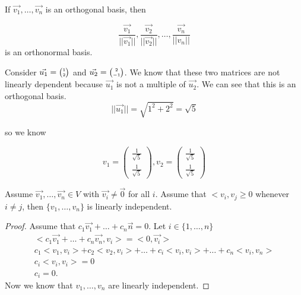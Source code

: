   If $\vec{v_1},\ldots,\vec{v_n}$ is an orthogonal basis, then 

  \begin{equation}
    \frac{\vec{v_1}}{| |\vec{v_1}| |},\frac{\vec{v_2}}{| | \vec{v_2} | |},\ldots,\frac{\vec{v_n}}{| | v_n | |}
  \end{equation}
  is an orthonormal basis.

  \begin{problem}
    Consider $\vec{u_1}=\SmallMatrix{1\\2}$ and $\vec{u_2}=\SmallMatrix{2\\-1}$. We know that these two matrices are not linearly dependent because $\vec{u_1}$ is not a multiple of $\vec{u_2}$. We can see that this is an orthogonal basis.
    \begin{equation}
      | | \vec{u_1} | | = \sqrt{1^2+2^2} =\sqrt{5} 
    \end{equation}

    so we know

    \begin{equation}
      v_1=\begin{pmatrix} \frac{1}{\sqrt{5} }\\\frac{1}{\sqrt{5} } \end{pmatrix} ,v_2=\begin{pmatrix} \frac{1}{\sqrt{5} }\\\frac{1}{\sqrt{5} } \end{pmatrix} 
    \end{equation}
  \end{problem}

  \begin{prop}
    Assume $\vec{v_1},\ldots,\vec{v_n}\in V$ with $\vec{v_i}\neq \vec{0}$ for all $i$. Assume that $<v_i,v_j\ge 0$ whenever $i\neq j$, then $\{v_1,\ldots,v_n\}$ is linearly independent.
    \begin{proof}
      Assume that $c_1\vec{v_1}+\ldots+c_n\vec{n}=0$. Let $i\in\{1,\ldots,n\}$
      \begin{align*}
        <c_1\vec{v_1}+\ldots+c_n \vec{v_n}, v_i> = <0,\vec{v_i}>\\
        c_1<v_1,v_i> + c_2<v_2,v_i>+\ldots+ c_i<v_i,v_i>+\ldots+c_n<v_i,v_n>\\
        c_i<v_i,v_i> = 0\\
        c_i = 0
      .\end{align*}
      Now we know that $v_1,\ldots,v_n$ are linearly independent.
    \end{proof}
  \end{prop}

